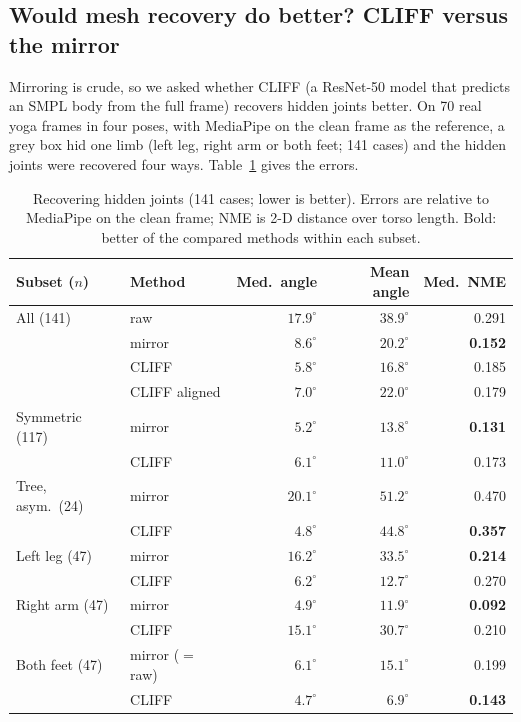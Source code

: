 \subsection{Would mesh recovery do better? CLIFF versus the mirror}
Mirroring is crude, so we asked whether CLIFF \cite{li2022cliff} (a ResNet-50 model that predicts an SMPL body \cite{loper2015smpl} from the full frame) recovers hidden joints better. On 70 real yoga frames in four poses, with MediaPipe on the clean frame as the reference, a grey box hid one limb (left leg, right arm or both feet; 141 cases) and the hidden joints were recovered four ways. Table~\ref{tab:cliff} gives the errors.
\begin{table}[t]
\centering\footnotesize\setlength{\tabcolsep}{3pt}
\caption{Recovering hidden joints (141 cases; lower is better). Errors are relative to MediaPipe on the clean frame; NME is 2-D distance over torso length. Bold: better of the compared methods within each subset.}\label{tab:cliff}
\begin{tabular}{@{}llrrr@{}}
\toprule
Subset ($n$) & Method & Med.\ angle & Mean angle & Med.\ NME \\ \midrule
All (141) & raw & $17.9^\circ$ & $38.9^\circ$ & 0.291 \\
 & mirror & $8.6^\circ$ & $20.2^\circ$ & \textbf{0.152} \\
 & CLIFF & $\mathbf{5.8^\circ}$ & $\mathbf{16.8^\circ}$ & 0.185 \\
 & CLIFF aligned & $7.0^\circ$ & $22.0^\circ$ & 0.179 \\ \midrule
Symmetric (117) & mirror & $\mathbf{5.2^\circ}$ & $13.8^\circ$ & \textbf{0.131} \\
 & CLIFF & $6.1^\circ$ & $\mathbf{11.0^\circ}$ & 0.173 \\
Tree, asym.\ (24) & mirror & $20.1^\circ$ & $51.2^\circ$ & 0.470 \\
 & CLIFF & $\mathbf{4.8^\circ}$ & $\mathbf{44.8^\circ}$ & \textbf{0.357} \\
Left leg (47) & mirror & $16.2^\circ$ & $33.5^\circ$ & \textbf{0.214} \\
 & CLIFF & $\mathbf{6.2^\circ}$ & $\mathbf{12.7^\circ}$ & 0.270 \\
Right arm (47) & mirror & $\mathbf{4.9^\circ}$ & $\mathbf{11.9^\circ}$ & \textbf{0.092} \\
 & CLIFF & $15.1^\circ$ & $30.7^\circ$ & 0.210 \\
Both feet (47) & mirror ($=$raw) & $6.1^\circ$ & $15.1^\circ$ & 0.199 \\
 & CLIFF & $\mathbf{4.7^\circ}$ & $\mathbf{6.9^\circ}$ & \textbf{0.143} \\ \bottomrule
\end{tabular}
\end{table}
